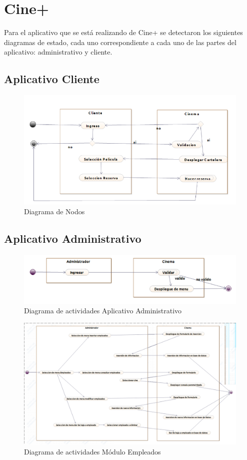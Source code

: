 \section{Cine+}
Para el aplicativo que se está realizando de Cine+ se detectaron los siguientes diagramas de estado, cada uno correspondiente a cada uno de las partes del aplicativo: administrativo y cliente.
\subsection*{Aplicativo Cliente}
\begin{figure}[h!]
	\centering
	\includegraphics[scale=0.5]{diseno/actividades/img/actividadesCliente}
	\caption{Diagrama de Nodos}
\end{figure}

\subsection*{Aplicativo Administrativo}
\begin{figure}[h!]
	\centering
	\includegraphics[scale=0.5]{diseno/actividades/img/inicio}
	\caption{Diagrama de actividades Aplicativo Administrativo}
\end{figure}


\begin{figure}[h!]
	\centering
	\includegraphics[scale=0.4]{diseno/actividades/img/empleados}
	\caption{Diagrama de actividades Módulo Empleados}
\end{figure}

